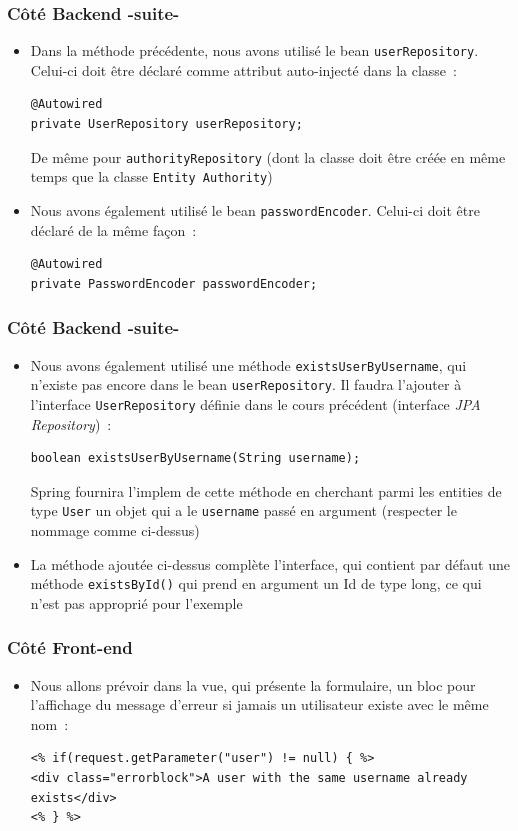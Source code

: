 \documentclass{beamer}
\begin{document}
\begin{frame}[fragile]
	\frametitle{Côté Backend -suite-}
	\begin{itemize}
		\item Dans la méthode précédente, nous avons utilisé le bean \texttt{userRepository}. Celui-ci doit être déclaré comme attribut auto-injecté dans la classe~:
\begin{lstlisting}
@Autowired
private UserRepository userRepository;
\end{lstlisting}	
De même pour \texttt{authorityRepository} (dont la classe doit être créée en même temps que la classe \texttt{Entity Authority})
		\item Nous avons également utilisé le bean \texttt{passwordEncoder}. Celui-ci doit être déclaré de la même façon~:
\begin{lstlisting}
@Autowired
private PasswordEncoder passwordEncoder;
\end{lstlisting}		
\end{itemize}
\end{frame}

\begin{frame}[fragile]
\frametitle{Côté Backend -suite-}
\begin{itemize}
		\item Nous avons également utilisé une méthode \texttt{existsUserByUsername}, qui n'existe pas encore dans le bean \texttt{userRepository}. Il faudra l'ajouter à l'interface \texttt{UserRepository} définie dans le cours précédent (interface \textit{JPA Repository})~:
\begin{lstlisting}
boolean existsUserByUsername(String username);
\end{lstlisting}
Spring fournira l'implem de cette méthode en cherchant parmi les entities de type \texttt{User} un objet qui a le \texttt{username} passé en argument (respecter le nommage comme ci-dessus)
\item La méthode ajoutée ci-dessus complète l'interface, qui contient par défaut une méthode \texttt{existsById()} qui prend en argument un Id de type long, ce qui n'est pas approprié pour l'exemple
	\end{itemize}
\end{frame}

\begin{frame}[fragile]
	\frametitle{Côté Front-end}
	\begin{itemize}
		\item Nous allons prévoir dans la vue, qui présente la formulaire, un bloc pour l'affichage du message d'erreur si jamais un utilisateur existe avec le même nom~:
\begin{lstlisting}
<% if(request.getParameter("user") != null) { %>
<div class="errorblock">A user with the same username already exists</div>
<% } %>
\end{lstlisting}
	\end{itemize}
\end{frame}
\end{document}
